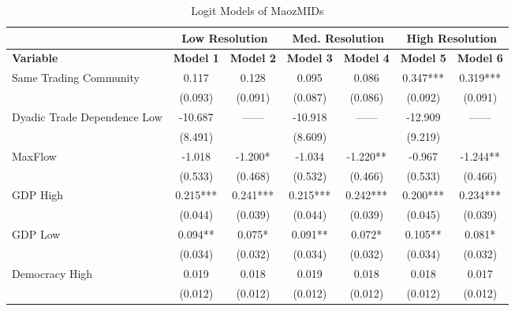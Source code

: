 \documentclass[11pt,fleqn]{article}
\begin{document}
\begin{table}[!h]
\small
\begin{center}
\begin{singlespace}
  \caption{Logit Models of {\sc MaozMIDs}}
  \label{tab:regression2}
\begin{tabularx}{7.1in}{lcccccc}
\hline \hline
 & \multicolumn{2}{X}{\textbf{Low Resolution}} & \multicolumn{2}{X}{\textbf{Med. Resolution}} & \multicolumn{2}{X}{\textbf{High Resolution}}\\
\hline \hline
\textbf{Variable} & \textbf{Model 1} & \textbf{Model 2} & \textbf{Model 3} & \textbf{Model 4} & \textbf{Model 5} & \textbf{Model 6}\\
\hline
Same Trading Community    &        0.117         &       0.128 &    0.095         &       0.086    &        0.347***&       0.319***   \\
            &   (0.093)         &     (0.091)         &   (0.087)         &     (0.086)        &    (0.092)         &     (0.091)         \\
Dyadic Trade Dependence Low &   -10.687        &     ------       &      -10.918         &       ------               &     -12.909          &   ------                   \\
            &     (8.491)         &                     &     (8.609)         &                     &     (9.219)          &                     \\
MaxFlow               &      -1.018         &      -1.200*  &      -1.034         &      -1.220** &      -0.967         &      -1.244** \\
                    &     (0.533)         &     (0.468)         &     (0.532)         &     (0.466)         &     (0.533)         &     (0.466)         \\
GDP High  &       0.215***&       0.241***&       0.215***&       0.242***&       0.200***&       0.234***\\
                    &     (0.044)         &     (0.039)         &     (0.044)         &     (0.039)         &     (0.045)         &     (0.039)                  \\
GDP Low             &       0.094** &       0.075*  &       0.091** &       0.072*  &       0.105** &       0.081*  \\
                    &     (0.034)         &     (0.032)         &     (0.034)         &     (0.032)         &     (0.034)         &     (0.032)         \\

Democracy High      &       0.019         &       0.018         &       0.019         &       0.018         &       0.018         &       0.017         \\
                    &     (0.012)         &     (0.012)         &     (0.012)         &     (0.012)         &     (0.012)         &     (0.012)         \\


\end{tabularx}
\end{singlespace}
\end{center}
\end{table}
\end{document}
